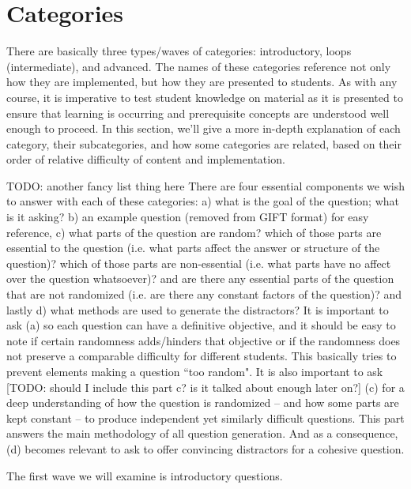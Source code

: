 \documentclass{article}
\begin{document}
\section{Categories} \label{sec-categoires}

There are basically three types/waves of categories: introductory, loops (intermediate), and advanced. The names of these categories reference not only how
they are implemented, but how they are presented to students. As with any course, it is imperative to test student knowledge on material as it is presented
to ensure that learning is occurring and prerequisite concepts are understood well enough to proceed. In this section, we'll give a more in-depth explanation
of each category, their subcategories, and how some categories are related, based on their order of relative difficulty of content and implementation.

TODO: another fancy list thing here
There are four essential components we wish to answer with each of these categories: a) what is the goal of the question; what is it asking? b) an example question
(removed from GIFT format) for easy reference, c) what parts of the question are random? which of those parts are essential to the question (i.e. what
parts affect the answer or structure of the question)? which of those parts are non-essential (i.e. what parts have no affect over the question whatsoever)?
and are there any essential parts of the question that are not randomized (i.e. are there any constant factors of the question)? and lastly d) what methods
are used to generate the distractors? It is important to ask (a) so each question can have a definitive objective, and it should be easy to note if
certain randomness adds/hinders that objective or if the randomness does not preserve a comparable difficulty for different students.
This basically tries to prevent elements making a question ``too random". It is also important to ask [TODO: should I include this part c? is it talked about enough later on?] (c) for a deep understanding of how the question
is randomized -- and how some parts are kept constant -- to produce independent yet similarly difficult questions. This part answers the main
methodology of all question generation. And as a consequence, (d) becomes relevant to ask to offer convincing distractors for a cohesive question.

The first wave we will examine is introductory questions.
\end{document}
